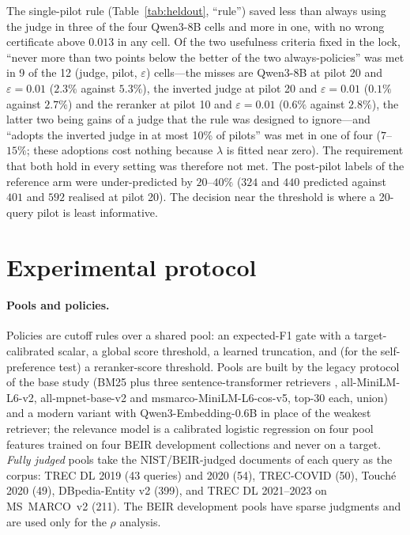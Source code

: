 \documentclass{article}
\newcommand{\eps}{\varepsilon}
\begin{document}
The single-pilot rule (Table~\ref{tab:heldout}, ``rule'') saved less than always using the judge in three of the four Qwen3-8B cells and more in one, with no wrong certificate above $0.013$ in any cell. Of the two usefulness criteria fixed in the lock, ``never more than two points below the better of the two always-policies'' was met in 9 of the 12 (judge, pilot, $\eps$) cells---the misses are Qwen3-8B at pilot 20 and $\eps=0.01$ ($2.3\%$ against $5.3\%$), the inverted judge at pilot 20 and $\eps=0.01$ ($0.1\%$ against $2.7\%$) and the reranker at pilot 10 and $\eps=0.01$ ($0.6\%$ against $2.8\%$), the latter two being gains of a judge that the rule was designed to ignore---and ``adopts the inverted judge in at most 10\% of pilots'' was met in one of four ($7$--$15\%$; these adoptions cost nothing because $\lambda$ is fitted near zero). The requirement that both hold in every setting was therefore not met. The post-pilot labels of the reference arm were under-predicted by $20$--$40\%$ ($324$ and $440$ predicted against $401$ and $592$ realised at pilot 20). The decision near the threshold is where a 20-query pilot is least informative.

\section{Experimental protocol}\label{sec:protocol}
\paragraph{Pools and policies.} Policies are cutoff rules over a shared pool: an expected-F1 gate with a target-calibrated scalar, a global score threshold, a learned truncation, and (for the self-preference test) a reranker-score threshold. Pools are built by the legacy protocol of the base study (BM25 \citep{robertson2009bm25,lu2024bm25s} plus three sentence-transformer retrievers \citep{reimers2019sbert}, all-MiniLM-L6-v2, all-mpnet-base-v2 and msmarco-MiniLM-L6-cos-v5, top-30 each, union) and a modern variant with Qwen3-Embedding-0.6B \citep{zhang2025qwen3embedding} in place of the weakest retriever; the relevance model is a calibrated logistic regression on four pool features trained on four BEIR \citep{thakur2021beir} development collections and never on a target. \emph{Fully judged} pools take the NIST/BEIR-judged documents of each query as the corpus: TREC DL 2019 \citep{craswell2020dl19} (43 queries) and 2020 \citep{craswell2021dl20} (54), TREC-COVID \citep{voorhees2020treccovid} (50), Touch\'e 2020 \citep{bondarenko2020touche} (49), DBpedia-Entity v2 \citep{hasibi2017dbpedia} (399), and TREC DL 2021--2023 \citep{craswell2021dl21,craswell2022dl22,craswell2023dl23} on MS~MARCO~v2 \citep{bajaj2016msmarco} (211). The BEIR development pools have sparse judgments and are used only for the $\rho$ analysis.
\end{document}
